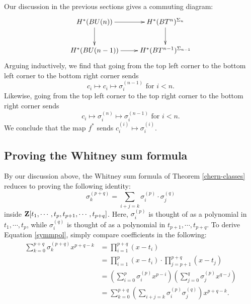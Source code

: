 Our discussion in the previous sections gives a commuting diagram:
\begin{equation*}
    \xymatrix{
	H^\ast(BU(n)) \ar[r] \ar[d] & H^\ast(BT^n)^{\Sigma_n}\ar[d]\\
	H^\ast(BU(n-1)) \ar[r] & H^\ast(BT^{n-1})^{\Sigma_{n-1}}
    }
\end{equation*}
Arguing inductively, we find that going from the top left corner to the bottom
left corner to the bottom right corner sends
$$c_i\mapsto c_i\mapsto \sigma_i^{(n-1)}\text{ for }i<n.$$
Likewise, going from the top left corner to the top right corner to the bottom
right corner sends
$$c_i\mapsto \sigma_i^{(n)}\mapsto \sigma_i^{(n-1)}\text{ for }i<n.$$
We conclude that the map $f^\ast$ sends $c_i^{(i)}\mapsto \sigma_i^{(i)}$.
\subsection{Proving the Whitney sum formula}
By our discussion above, the Whitney sum formula of Theorem \ref{chern-classes}
reduces to proving the following identity:
\begin{equation}\label{symmpol}
    \sigma^{(p+q)}_k = \sum_{i+j=k}\sigma_i^{(p)}\cdot\sigma_j^{(q)}
\end{equation}
inside $\mathbf Z[t_1,\cdots,t_p,t_{p+1},\cdots,t_{p+q}]$. Here, $\sigma_i^{(p)}$ is
thought of as a polynomial in $t_1,\cdots,t_p$, while $\sigma_i^{(q)}$ is
thought of as a polynomial in $t_{p+1},\cdots,t_{p+q}$. To derive Equation
\eqref{symmpol}, simply compare coefficients in the following:
\begin{align*}
    \sum_{k=0}^{p+q} \sigma_k^{(p+q)}x^{p+q-k} & = \prod^{p+q}_{i=1}(x-t_i)\\
    & = \prod^p_{i=1}(x-t_i)\cdot\prod^{p+q}_{j=p+1}(x-t_j)\\
    & = \left(\sum^p_{i=0}\sigma^{(p)}_i
    x^{p-i}\right)\left(\sum^q_{j=0}\sigma_j^{(p)} x^{q-j}\right)\\
    & =
    \sum^{p+q}_{k=0}\left(\sum_{i+j=k}\sigma_i^{(p)}\sigma_j^{(q)}\right)x^{p+q-k}.
\end{align*}
